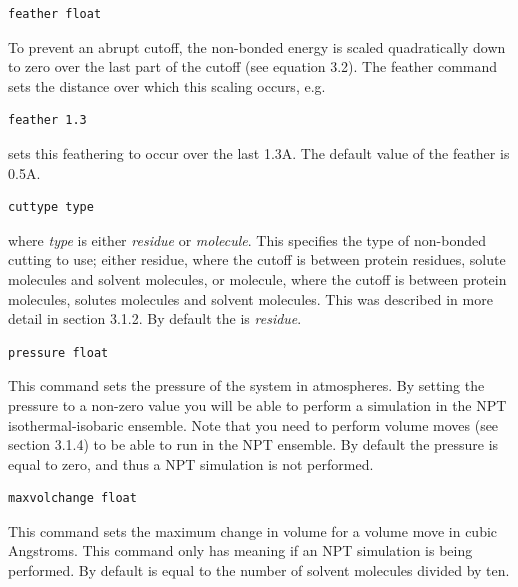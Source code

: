 \documentclass[letterpaper,10pt,english]{sphinxmanual}
\begin{document}
\begin{Verbatim}[commandchars=\\\{\}]
feather float
\end{Verbatim}

To prevent an abrupt cutoff, the non-bonded energy is scaled quadratically down to zero over the last part of the cutoff (see equation 3.2). The feather command sets the distance over which this scaling occurs, e.g.

\begin{Verbatim}[commandchars=\\\{\}]
feather 1.3
\end{Verbatim}

sets this feathering to occur over the last 1.3A. The default value of the feather is 0.5A.

\begin{Verbatim}[commandchars=\\\{\}]
cuttype type
\end{Verbatim}

where \emph{type} is either \emph{residue} or \emph{molecule}. This specifies the type of non-bonded cutting to use; either residue, where the cutoff is between protein residues, solute molecules and solvent molecules, or molecule, where the cutoff is between protein molecules, solutes molecules and solvent molecules. This was described in more detail in section 3.1.2. By default the  is \emph{residue}.

\begin{Verbatim}[commandchars=\\\{\}]
pressure float
\end{Verbatim}

This command sets the pressure of the system in atmospheres. By setting the pressure to a non-zero value you will be able to perform a simulation in the NPT isothermal-isobaric ensemble. Note that you need to perform volume moves (see section 3.1.4) to be able to run in the NPT ensemble. By default the pressure is equal to zero, and thus a NPT simulation is not performed.

\begin{Verbatim}[commandchars=\\\{\}]
maxvolchange float
\end{Verbatim}

This command sets the maximum change in volume for a volume move in cubic Angstroms. This command only has meaning if an NPT simulation is being performed. By default  is equal to the number of solvent molecules divided by ten.
\end{document}
